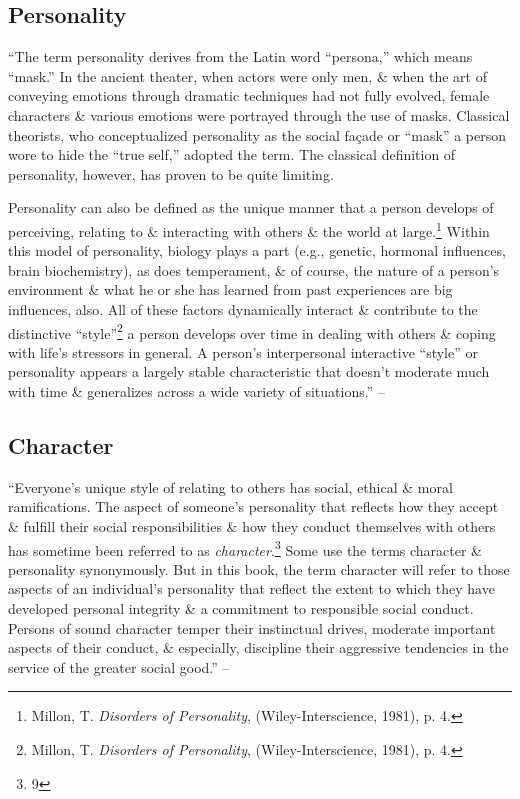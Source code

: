 \documentclass{article}
\numberwithin{equation}{section}
\begin{document}
\subsection{Personality}
``The term personality derives from the Latin word ``persona,'' which means ``mask.'' In the ancient theater, when actors were only men, \& when the art of conveying emotions through dramatic techniques had not fully evolved, female characters \& various emotions were portrayed through the use of masks. Classical theorists, who conceptualized personality as the social fa\c{c}ade or ``mask'' a person wore to hide the ``true self,'' adopted the term. The classical definition of personality, however, has proven to be quite limiting.

Personality can also be defined as the unique manner that a person develops of perceiving, relating to \& interacting with others \& the world at large.\footnote{Millon, T. \textit{Disorders of Personality}, (Wiley-Interscience, 1981), p. 4.} Within this model of personality, biology plays a part (e.g., genetic, hormonal influences, brain biochemistry), as does temperament, \& of course, the nature of a person's environment \& what he or she has learned from past experiences are big influences, also. All of these factors dynamically interact \& contribute to the distinctive ``style''\footnote{Millon, T. \textit{Disorders of Personality}, (Wiley-Interscience, 1981), p. 4.} a person develops over time in dealing with others \& coping with life's stressors in general. A person's interpersonal interactive ``style'' or personality appears a largely stable characteristic that doesn't moderate much with time \& generalizes across a wide variety of situations.'' -- \cite[pp. 27--28]{Simon2010}

\subsection{Character}
``Everyone's unique style of relating to others has social, ethical \& moral ramifications. The aspect of someone's personality that reflects how they accept \& fulfill their social responsibilities \& how they conduct themselves with others has sometime been referred to as \textit{character}.\footnote{9} Some use the terms character \& personality synonymously. But in this book, the term character will refer to those aspects of an individual's personality that reflect the extent to which they have developed personal integrity \& a commitment to responsible social conduct. Persons of sound character temper their instinctual drives, moderate important aspects of their conduct, \& especially, discipline their aggressive tendencies in the service of the greater social good.'' -- \cite[p. 28]{Simon2010}
\end{document}
